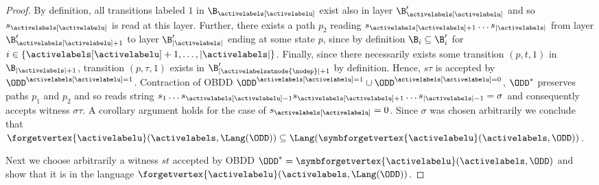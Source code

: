\begin{proof}
    By definition, all transitions labeled $1$ in $\B_{\activelabels[\activelabelu]}$ exist also in layer $\B_{\activelabels[\activelabelu]}'$ and so $s_{\activelabels[\activelabelu]}$ is read at this layer. Further, there exists a path $p_2$ reading $s_{\activelabels[\activelabelu]+1}\dots s_{|\activelabels|}$ from layer $\B_{\activelabels[\activelabelu]+1}'$ to layer $\B_{|\activelabels|}'$ ending at some state $p$, since by definition $\B_i \subseteq \B_i'$ for $i \in \{\activelabels[\activelabelu]+1,\ldots,|\activelabels|\}$. Finally, since there necessarily exists some transition $(p,t,1)$ in $\B_{|\activelabels|+1}$, transition $(p,\tau,1)$ exists in $\B_{|\activelabelsatnode{\nodep}|+1}'$ by definition. Hence, $s\tau$ is accepted by $\ODD^{\activelabels[\activelabelu]=1}$. Contraction of OBDD $\ODD^{\activelabels[\activelabelu]=1} \cup \ODD^{\activelabels[\activelabelu]=0}$, $\ODD^*$ preserves paths $p_1$ and $p_2$ and so reads string $s_1\dots s_{\activelabels[\activelabelu]-1} s_{\activelabels[\activelabelu]+1}\dots s_{|\activelabels|-1} = \sigma$ and consequently accepts witness $\sigma\tau$. A corollary argument holds for the case of $s_{\activelabels[\activelabelu]} = 0$. Since $\sigma$ was chosen arbitrarily we conclude that $\forgetvertex{\activelabelu}(\activelabels,\Lang(\ODD)) \subseteq \Lang(\symbforgetvertex{\activelabelu}(\activelabels,\ODD))$.

    Next we choose arbitrarily a witness $st$ accepted by OBDD $\ODD^* = \symbforgetvertex{\activelabelu}(\activelabels,\ODD)$ and show that it is in the language $\forgetvertex{\activelabelu}(\activelabels,\Lang(\ODD))$. 



\end{proof}
